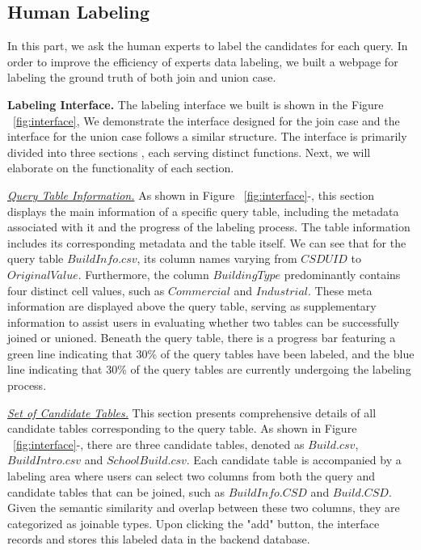 \subsection{Human Labeling}
In this part, we ask the human experts to label the candidates for each query. In order to improve the efficiency of experts data labeling, we built a webpage for labeling the ground truth of both join and union case.


\noindent \textbf{Labeling Interface.} 
The labeling interface we built is shown in the Figure ~\ref{fig:interface}, We demonstrate the interface designed for the join case and the interface for the union case follows a similar structure. The interface is primarily divided into three sections , each serving distinct functions. Next, we will elaborate on the functionality of each section.

\noindent \underline{\textit{Query Table Information.}}  
As shown in Figure ~\ref{fig:interface}-, this section 
displays the main information of a specific query table, including the metadata associated with it and the progress of the labeling process. The table information  includes its corresponding metadata and the table itself. We can see that for the query table $BuildInfo.csv$, its column names varying from $CSDUID$ to $OriginalValue$. Furthermore, the column $Building Type$ predominantly contains four distinct cell values, such as $Commercial$ and $Industrial$. These meta information are displayed above the query table, serving as supplementary information to assist users in  evaluating whether two tables can be successfully joined or unioned. Beneath the query table, there is a progress bar featuring a green line indicating that 30\% of the query tables have been labeled, and the blue line indicating that 30\% of the query tables are currently undergoing the labeling process.

\noindent \underline{\textit{Set of Candidate Tables.}} This section presents comprehensive details of all candidate tables corresponding to the query table. As shown in Figure ~\ref{fig:interface}-, there are three candidate tables, denoted as $Build.csv$, $BuildIntro.csv$ and $SchoolBuild.csv$. Each candidate table is accompanied by a labeling area where users can select two columns from both the query and candidate tables that can be joined, such as $BuildInfo.CSD$ and $Build.CSD$. Given the semantic similarity and overlap between these two columns, they are categorized as joinable types. Upon clicking the "add" button, the interface records and stores this labeled data in the backend database.

